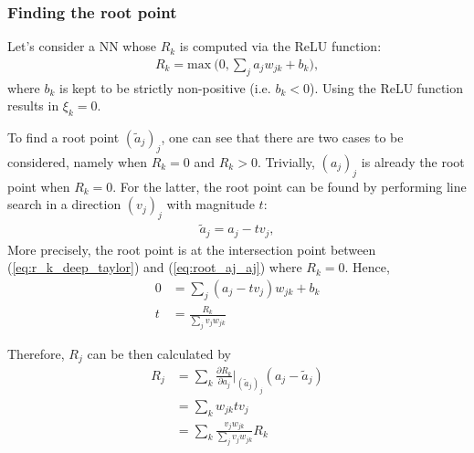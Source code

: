  
 

\subsubsection{Finding the root point} 
Let's consider a NN whose $R_k$ is computed via the ReLU function:
\begin{align}\label{eq:r_k_deep_taylor}
R_k = \text{max}\ \bigg(0, \sum_{j} a_j w_{jk}  + b_k \bigg),
\end{align}
where $b_k$ is kept to be strictly non-positive (i.e. $b_k < 0$). Using the ReLU function results in $\xi_k=0$.

To find a root point $(\tilde{a}_j)_j$, one can see that  there are  two cases to be considered, namely when $R_k = 0$ and $R_k > 0$. Trivially, $(a_j)_j$ is already the root point when $R_k=0$. For the latter, the root point can be found by performing  line search in  a direction $(v_j)_j$ with magnitude $t$:
\begin{align}\label{eq:root_aj_aj}
\tilde{a}_j = a_j - t v_j,
\end{align}
More precisely, the root point is at the intersection point between (\ref{eq:r_k_deep_taylor}) and (\ref{eq:root_aj_aj}) where $R_k=0$. Hence,
\begin{align*}
  0 &= 	\sum_{j} (a_j - t v_j) w_{jk}  + b_k\\
  t &= \frac{R_k}{\sum_{j} v_j w_{jk}}
\end{align*}

Therefore, $R_j$ can be then calculated by
\begin{align*}
R_j &= \sum_k	\frac{\partial  R_k }{ \partial a_j } \bigg|_{ (\tilde{a}_j)_j }  ( a_j - \tilde{a}_j ) \\
&=	\sum_k w_{jk} tv_j \\
&=	\sum_k \frac{ v_j w_{jk}   }{\sum_{j} v_j w_{jk}}  R_k
\end{align*}

